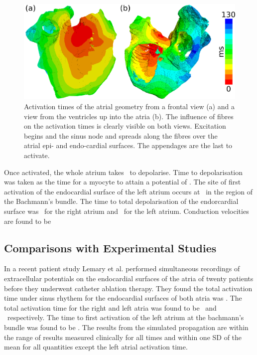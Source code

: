 \begin{figure}
\includegraphics{figures/atrium/validation/activation_times}
\caption[Activation Times Under Sinus Rhythm]{
\label{fig:atrium:validation:times}
Activation times of the atrial geometry from a frontal view (a) and a
view from the ventricles up into the atria (b).
The influence of fibres on the activation times is clearly visible on both
views.
Excitation begins and the sinus node and spreads along the fibres over the
atrial epi- and endo-cardial surfaces.
The appendages are the last to activate.
}
\end{figure}

Once activated, the whole atrium takes \ to depolarise.
Time to depolarisation was taken as the time for a myocyte to attain a potential
of .
The site of first activation of the endocardial surface of the left atrium
occurs at \ in the region of the Bachmann's bundle.
The time to total depolarisation of the endorcardial surface was \ for
the right atrium and \ for the left atrium.
Conduction velocities are found to be


\subsection{Comparisons with Experimental Studies}

In a recent patient study Lemary et al. performed simultaneous recordings of
extracellular potentials on the endocardial surfaces of the atria of twenty
patients before they underwent catheter ablation therapy.
They found the total activation time under sinus rhythem for the endocardial
surfaces of both atria was .
The total activation time for the right and left atria was found to be \
and \ respectively.
The time to first activation of the left atrium at the bachmann's bundle was
found to be \ms{41}.
The results from the simulated propagation are within the range of results
measured clinically for all times and within one SD of the mean for all
quantities except the left atrial activation time.

